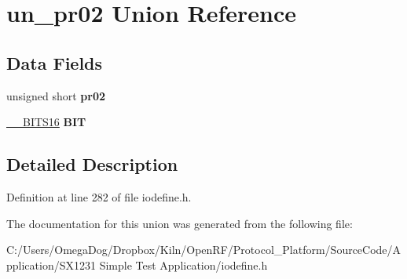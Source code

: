 \hypertarget{unionun__pr02}{\section{un\-\_\-pr02 Union Reference}
\label{unionun__pr02}
}
\subsection*{Data Fields}
\begin{DoxyCompactItemize}
\item 
\hypertarget{unionun__pr02_a213c4e8d77136aea5dcebcbaf78ff0ed}{unsigned short {\bfseries pr02}}\label{unionun__pr02_a213c4e8d77136aea5dcebcbaf78ff0ed}

\item 
\hypertarget{unionun__pr02_adf570bc6dee703683420819effeccf5c}{\hyperlink{struct_____b_i_t_s16}{\-\_\-\-\_\-\-B\-I\-T\-S16} {\bfseries B\-I\-T}}\label{unionun__pr02_adf570bc6dee703683420819effeccf5c}

\end{DoxyCompactItemize}


\subsection{Detailed Description}


Definition at line 282 of file iodefine.\-h.



The documentation for this union was generated from the following file\-:\begin{DoxyCompactItemize}
\item 
C\-:/\-Users/\-Omega\-Dog/\-Dropbox/\-Kiln/\-Open\-R\-F/\-Protocol\-\_\-\-Platform/\-Source\-Code/\-Application/\-S\-X1231 Simple Test Application/iodefine.\-h\end{DoxyCompactItemize}
